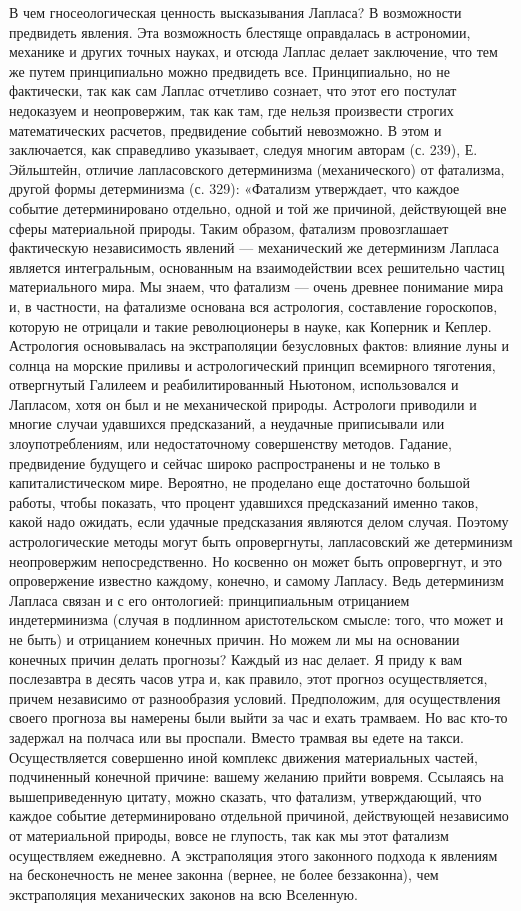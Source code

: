 В чем гносеологическая ценность высказывания Лапласа? В возможности
предвидеть явления. Эта возможность блестяще оправдалась в астрономии,
механике и других точных науках, и отсюда Лаплас делает заключение, что тем же
путем принципиально можно предвидеть все. Принципиально, но не фактически, так
как сам Лаплас отчетливо сознает, что этот его постулат недоказуем и
неопровержим, так как там, где нельзя произвести строгих математических
расчетов, предвидение событий невозможно. В этом и заключается, как
справедливо указывает, следуя многим авторам (с. 239), Е. Эйльштейн,
отличие лапласовского детерминизма (механического) от фатализма, другой
формы детерминизма (с. 329): «Фатализм утверждает, что каждое событие
детерминировано отдельно, одной и той же причиной, действующей вне сферы
материальной природы. Таким образом, фатализм провозглашает фактическую
независимость явлений --- механический же детерминизм Лапласа является
интегральным, основанным на взаимодействии всех решительно частиц
материального мира. Мы знаем, что фатализм --- очень древнее понимание мира и,
в частности, на фатализме основана вся астрология, составление гороскопов,
которую не отрицали и такие революционеры в науке, как Коперник и Кеплер.
Астрология основывалась на экстраполяции безусловных фактов: влияние луны и
солнца на морские приливы и астрологический принцип всемирного тяготения,
отвергнутый Галилеем и реабилитированный Ньютоном, использовался и
Лапласом, хотя он был и не механической природы. Астрологи приводили и
многие случаи удавшихся предсказаний, а неудачные приписывали или
злоупотреблениям, или недостаточному совершенству методов. Гадание,
предвидение будущего и сейчас
широко распространены и не только в капиталистическом мире. Вероятно, не
проделано еще достаточно большой работы, чтобы показать, что процент
удавшихся предсказаний именно таков, какой надо ожидать, если удачные
предсказания являются делом случая. Поэтому астрологические методы могут
быть опровергнуты, лапласовский же детерминизм неопровержим
непосредственно. Но косвенно он может быть опровергнут, и это опровержение
известно каждому, конечно, и самому Лапласу. Ведь детерминизм Лапласа
связан и с его онтологией: принципиальным отрицанием индетерминизма (случая в
подлинном аристотельском смысле: того, что может и не быть) и отрицанием
конечных причин. Но можем ли мы на основании конечных причин делать
прогнозы? Каждый из нас делает. Я приду к вам послезавтра в десять часов
утра и, как правило, этот прогноз осуществляется, причем независимо от
разнообразия условий. Предположим, для осуществления своего прогноза вы
намерены были выйти за час и ехать трамваем. Но вас кто-то задержал на
полчаса или вы проспали. Вместо трамвая вы едете на такси. Осуществляется
совершенно иной комплекс движения материальных частей, подчиненный конечной
причине: вашему желанию прийти вовремя. Ссылаясь на вышеприведенную цитату,
можно сказать, что фатализм, утверждающий, что каждое событие
детерминировано отдельной причиной, действующей независимо от материальной
природы, вовсе не глупость, так как мы этот фатализм осуществляем
ежедневно. А экстраполяция этого законного подхода к явлениям на
бесконечность не менее законна (вернее, не более беззаконна), чем
экстраполяция механических законов на всю Вселенную.

